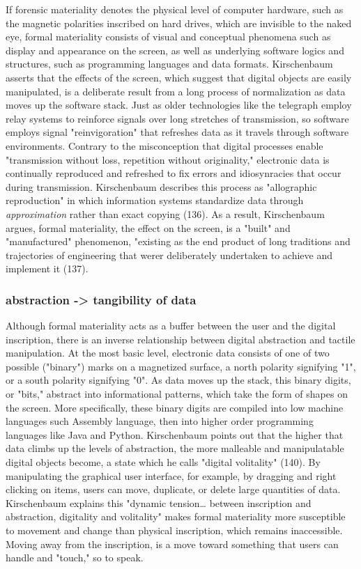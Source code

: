 \documentclass[11pt]{article}
\begin{document}
If forensic materiality denotes the physical level of computer
hardware, such as the magnetic polarities inscribed on hard drives,
which are invisible to the naked eye, formal materiality consists of
visual and conceptual phenomena such as display and appearance on the
screen, as well as underlying software logics and structures, such as
programming languages and data formats. Kirschenbaum asserts that the
effects of the screen, which suggest that digital objects are easily
manipulated, is a deliberate result from a long process of
normalization as data moves up the software stack. Just as older
technologies like the telegraph employ relay systems to reinforce
signals over long stretches of transmission, so software employs
signal "reinvigoration" that refreshes data as it travels through
software environments. Contrary to the misconception that digital
processes enable "transmission without loss, repetition without
originality," electronic data is continually reproduced and refreshed
to fix errors and idiosynracies that occur during
transmission. Kirschenbaum describes this process as "allographic
reproduction" in which information systems standardize data through
\emph{approximation} rather than exact copying (136). As a result,
Kirschenbaum argues, formal materiality, the effect on the screen, is
a "built" and "manufactured" phenomenon, "existing as the end product
of long traditions and trajectories of engineering that werer
deliberately undertaken to achieve and implement it (137).

\subsubsection{abstraction -> tangibility of data}
\label{sec:orgaa3b2ae}
Although formal materiality acts as a buffer between the user and the
digital inscription, there is an inverse relationship between digital
abstraction and tactile manipulation. At the most basic level,
electronic data consists of one of two possible ("binary") marks on a
magnetized surface, a north polarity signifying "1", or a south
polarity signifying "0". As data moves up the stack, this binary
digits, or "bits," abstract into informational patterns, which take
the form of shapes on the screen. More specifically, these binary
digits are compiled into low machine languages such Assembly language,
then into higher order programming languages like Java and
Python. Kirschenbaum points out that the higher that data climbs up
the levels of abstraction, the more malleable and manipulatable
digital objects become, a state which he calls "digital volitality"
(140). By manipulating the graphical user interface, for example, by
dragging and right clicking on items, users can move, duplicate, or
delete large quantities of data. Kirschenbaum explains this "dynamic
tension\ldots{} between inscription and abstraction, digitality and
volitality" makes formal materiality more susceptible to movement and
change than physical inscription, which remains inaccessible. Moving
away from the inscription, is a move toward something that users can
handle and "touch," so to speak.
\end{document}
